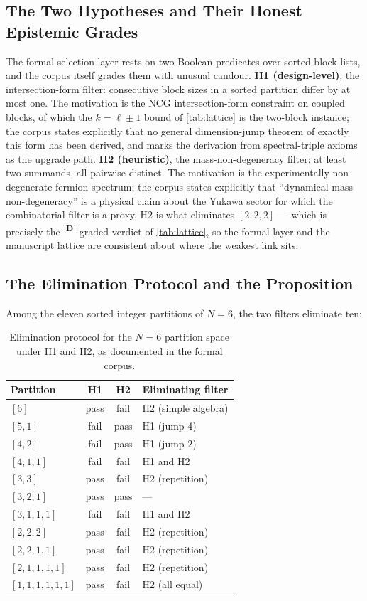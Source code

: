 \documentclass[12pt,a4paper,twoside]{article}
\theoremstyle{plain}
\theoremstyle{definition}
\theoremstyle{remark}
\newcommand{\catmark}[1]{\textsuperscript{\textsf{\textbf{[#1]}}}}
\begin{document}
\subsection{The Two Hypotheses and Their Honest Epistemic Grades}
\label{subsec:h1h2}

The formal selection layer rests on two Boolean predicates over sorted
block lists, and the corpus itself grades them with unusual candour.
\textbf{H1 (design-level)}, the intersection-form filter: consecutive
block sizes in a sorted partition differ by at most one. The motivation is
the NCG intersection-form constraint on coupled blocks, of which the
$k = \ell \pm 1$ bound of \cref{tab:lattice} is the two-block instance;
the corpus states explicitly that no general dimension-jump theorem of
exactly this form has been derived, and marks the derivation from
spectral-triple axioms as the upgrade path. \textbf{H2 (heuristic)}, the
mass-non-degeneracy filter: at least two summands, all pairwise distinct.
The motivation is the experimentally non-degenerate fermion spectrum; the
corpus states explicitly that ``dynamical mass non-degeneracy'' is a
physical claim about the Yukawa sector for which the combinatorial filter
is a proxy. H2 is what eliminates $[2,2,2]$ --- which is precisely the
\catmark{D}-graded verdict of \cref{tab:lattice}, so the formal layer and
the manuscript lattice are consistent about where the weakest link sits.

\subsection{The Elimination Protocol and the Proposition}
\label{subsec:elimination}

Among the eleven sorted integer partitions of $N=6$, the two filters
eliminate ten:

\begin{table}[H]
\centering\small
\begin{tabular}{@{}lccl@{}}
\toprule
Partition & H1 & H2 & Eliminating filter \\
\midrule
$[6]$ & pass & fail & H2 (simple algebra) \\
$[5,1]$ & fail & pass & H1 (jump 4) \\
$[4,2]$ & fail & pass & H1 (jump 2) \\
$[4,1,1]$ & fail & fail & H1 and H2 \\
$[3,3]$ & pass & fail & H2 (repetition) \\
$[3,2,1]$ & pass & pass & --- \\
$[3,1,1,1]$ & fail & fail & H1 and H2 \\
$[2,2,2]$ & pass & fail & H2 (repetition) \\
$[2,2,1,1]$ & pass & fail & H2 (repetition) \\
$[2,1,1,1,1]$ & pass & fail & H2 (repetition) \\
$[1,1,1,1,1,1]$ & pass & fail & H2 (all equal) \\
\bottomrule
\end{tabular}
\caption{Elimination protocol for the $N=6$ partition space under
H1 and H2, as documented in the formal corpus.}
\label{tab:elimination}
\end{table}
\end{document}
